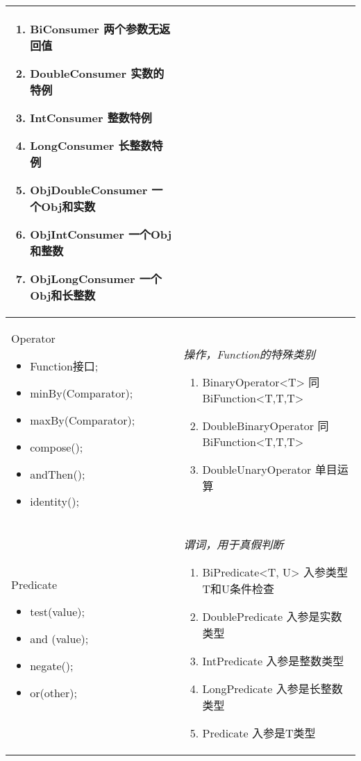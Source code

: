 \begin{longtable}{|p{4cm}|p{8.5cm}|}
\begin{enumerate}
		\item BiConsumer 两个参数无返回值
		\item DoubleConsumer 实数的特例
		\item IntConsumer 整数特例
		\item LongConsumer 长整数特例
		\item ObjDoubleConsumer 一个Obj和实数
		\item ObjIntConsumer 一个Obj和整数
		\item ObjLongConsumer 一个Obj和长整数
	\end{enumerate} \\
	\hline
	Operator
	\begin{itemize}
		\small
		\setlength{\itemindent}{-1.2em}
		\setlength{\itemsep}{0pt}
		\item Function接口;
		\item minBy(Comparator);
		\item maxBy(Comparator);
		\item compose();
		\item andThen();
		\item identity();
	\end{itemize} & \emph{操作，Function的特殊类别}
	\begin{enumerate}
		\setlength{\itemsep}{0pt}
		\small
		\item BinaryOperator<T> 同BiFunction<T,T,T>
		\item DoubleBinaryOperator 同BiFunction<T,T,T>
		\item DoubleUnaryOperator 单目运算
	\end{enumerate} \\
	\hline
	Predicate
	\begin{itemize}
		\small
		\setlength{\itemindent}{-1.2em}
		\setlength{\itemsep}{0pt}
		\item test(value);
		\item and (value);
		\item negate();
		\item or(other);
	\end{itemize}& \emph{谓词，用于真假判断}
	\begin{enumerate}
		\setlength{\itemsep}{0pt}
		\small
		\item BiPredicate<T, U> 入参类型T和U条件检查
		\item DoublePredicate 入参是实数类型
		\item IntPredicate 入参是整数类型
		\item LongPredicate 入参是长整数类型
		\item Predicate 入参是T类型

\end{enumerate}
\end{longtable}
